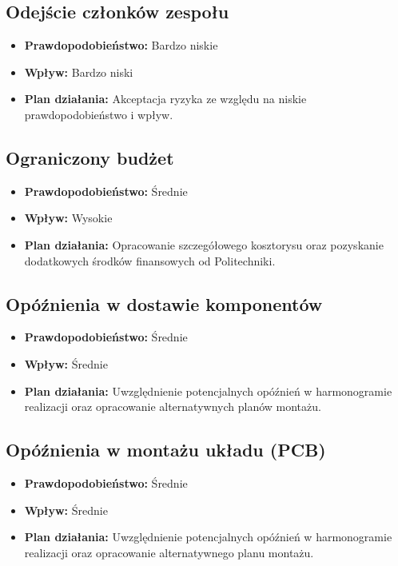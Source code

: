 \subsection{Odejście członków zespołu}
\begin{itemize}
    \item \textbf{Prawdopodobieństwo:} Bardzo niskie
    \item \textbf{Wpływ:} Bardzo niski
    \item \textbf{Plan działania:} Akceptacja ryzyka ze względu na niskie prawdopodobieństwo i wpływ.
\end{itemize}

\subsection{Ograniczony budżet}
\begin{itemize}
    \item \textbf{Prawdopodobieństwo:} Średnie
    \item \textbf{Wpływ:} Wysokie
    \item \textbf{Plan działania:} Opracowanie szczegółowego kosztorysu oraz pozyskanie dodatkowych środków finansowych od Politechniki.
\end{itemize}

\subsection{Opóźnienia w dostawie komponentów}
\begin{itemize}
    \item \textbf{Prawdopodobieństwo:} Średnie
    \item \textbf{Wpływ:} Średnie
    \item \textbf{Plan działania:} Uwzględnienie potencjalnych opóźnień w harmonogramie realizacji oraz opracowanie alternatywnych planów montażu.
\end{itemize}

\subsection{Opóźnienia w montażu układu (PCB)}
\begin{itemize}
    \item \textbf{Prawdopodobieństwo:} Średnie
    \item \textbf{Wpływ:} Średnie
    \item \textbf{Plan działania:} Uwzględnienie potencjalnych opóźnień w harmonogramie realizacji oraz opracowanie alternatywnego planu montażu.
\end{itemize}

